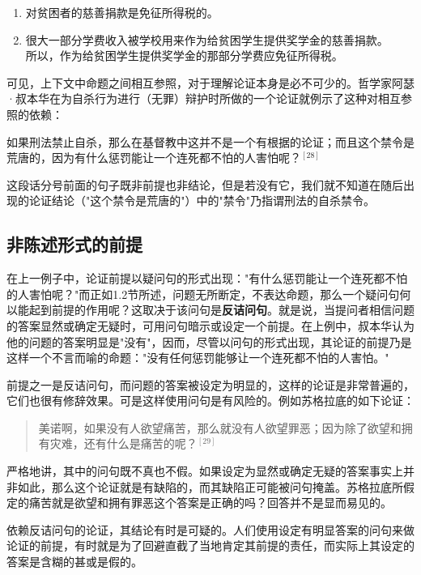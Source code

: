 \begin{enumerate}
  \item 对贫困者的慈善捐款是免征所得税的。
  \item 很大一部分学费收入被学校用来作为给贫困学生提供奖学金的慈善捐款。\\
  所以，作为给贫困学生提供奖学金的那部分学费应免征所得税。
\end{enumerate}

可见，上下文中命题之间相互参照，对于理解论证本身是必不可少的。哲学家阿瑟·叔本华在为自杀行为进行（无罪）辩护时所做的一个论证就例示了这种对相互参照的依赖：

\begin{displayquote}
如果刑法禁止自杀，那么在基督教中这并不是一个有根据的论证；而且这个禁令是荒唐的，因为有什么惩罚能让一个连死都不怕的人害怕呢？${}^{[28]}$
\end{displayquote}

这段话分号前面的句子既非前提也非结论，但是若没有它，我们就不知道在随后出现的论证结论（"这个禁令是荒唐的"）中的"禁令"乃指谓刑法的自杀禁令。

\subsection{非陈述形式的前提}

在上一例子中，论证前提以疑问句的形式出现："有什么惩罚能让一个连死都不怕的人害怕呢？"而正如1.2节所述，问题无所断定，不表达命题，那么一个疑问句何以能起到前提的作用呢？这取决于该问句是\textbf{反诘问句}。就是说，当提问者相信问题的答案显然或确定无疑时，可用问句暗示或设定一个前提。在上例中，叔本华认为他的问题的答案明显是"没有"，因而，尽管以问句的形式出现，其论证的前提乃是这样一个不言而喻的命题："没有任何惩罚能够让一个连死都不怕的人害怕。"

前提之一是反诘问句，而问题的答案被设定为明显的，这样的论证是非常普遍的，它们也很有修辞效果。可是这样使用问句是有风险的。例如苏格拉底的如下论证：

\begin{quotation}
美诺啊，如果没有人欲望痛苦，那么就没有人欲望罪恶；因为除了欲望和拥有灾难，还有什么是痛苦的呢？${}^{[29]}$
\end{quotation}

严格地讲，其中的问句既不真也不假。如果设定为显然或确定无疑的答案事实上并非如此，那么这个论证就是有缺陷的，而其缺陷正可能被问句掩盖。苏格拉底所假定的痛苦就是欲望和拥有罪恶这个答案是正确的吗？回答并不是显而易见的。

依赖反诘问句的论证，其结论有时是可疑的。人们使用设定有明显答案的问句来做论证的前提，有时就是为了回避直截了当地肯定其前提的责任，而实际上其设定的答案是含糊的甚或是假的。

